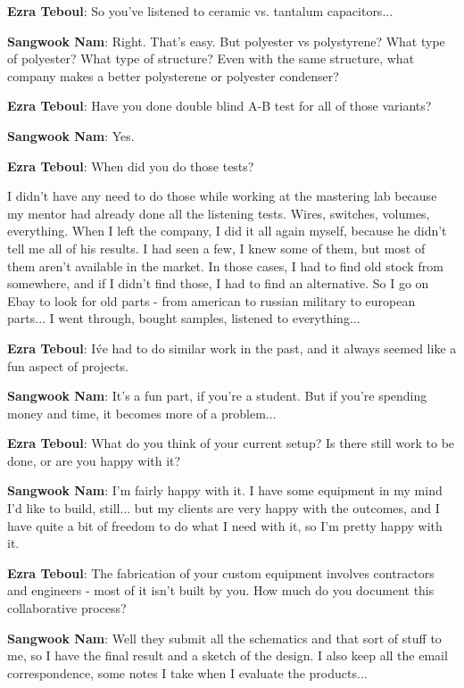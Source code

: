 \textbf{Ezra Teboul}: So you've listened to ceramic vs. tantalum capacitors...

\textbf{Sangwook Nam}: Right. That's easy. But polyester vs polystyrene? What type of polyester? What type of structure? Even with the same structure, what company makes a better polysterene or polyester condenser?

\textbf{Ezra Teboul}: Have you done double blind A-B test for all of those variants?

\textbf{Sangwook Nam}: Yes.

\textbf{Ezra Teboul}: When did you do those tests?

I didn't have any need to do those while working at the mastering lab because my mentor had already done all the listening tests. Wires, switches, volumes, everything. When I left the company, I did it all again myself, because he didn't tell me all of his results. I had seen a few, I knew some of them, but most of them aren't available in the market. In those cases, I had to find old stock from somewhere, and if I didn't find those, I had to find an alternative. So I go on Ebay to look for old parts - from american to russian military to european parts... I went through, bought samples, listened to everything...

\textbf{Ezra Teboul}: I\'ve had to do similar work in the past, and it always seemed like a fun aspect of projects.

\textbf{Sangwook Nam}: It's a fun part, if you're a student. But if you're spending money and time, it becomes more of a problem...

\textbf{Ezra Teboul}: What do you think of your current setup? Is there still work to be done, or are you happy with it?

\textbf{Sangwook Nam}: I'm fairly happy with it. I have some equipment in my mind I'd like to build, still... but my clients are very happy with the outcomes, and I have quite a bit of freedom to do what I need with it, so I'm pretty happy with it.

\textbf{Ezra Teboul}: The fabrication of your custom equipment involves contractors and engineers - most of it isn't built by you. How much do you document this collaborative process?

\textbf{Sangwook Nam}: Well they submit all the schematics and that sort of stuff to me, so I have the final result and a sketch of the design. I also keep all the email correspondence, some notes I take when I evaluate the products...

